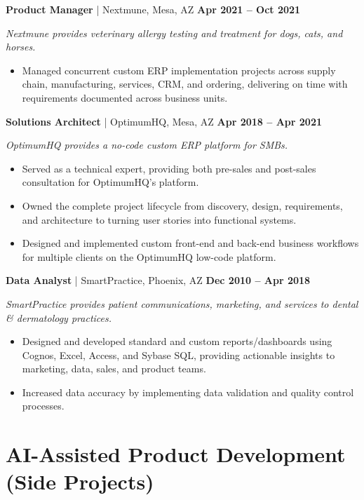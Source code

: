 \documentclass[10pt,letterpaper]{article}
\newcommand{\role}[4]{%
  \vspace{4pt}%
  {\textbf{#2} \textcolor{rulegray}{|} #1 \hfill \textbf{#3}}\par
  {\small\itshape #4\par}}
\newenvironment{roleblock}{\par\begin{minipage}{\textwidth}}{\end{minipage}\par\vspace{7pt}}
\begin{document}
\begin{roleblock}
\role{Nextmune, Mesa, AZ}{Product Manager}{Apr 2021 -- Oct 2021}
{Nextmune provides veterinary allergy testing and treatment for dogs, cats, and horses.}
\begin{itemize}
  \item Managed concurrent custom ERP implementation projects across supply chain, manufacturing, services, CRM, and ordering, delivering on time with requirements documented across business units.
\end{itemize}
\end{roleblock}

\begin{roleblock}
\role{OptimumHQ, Mesa, AZ}{Solutions Architect}{Apr 2018 -- Apr 2021}
{OptimumHQ provides a no-code custom ERP platform for SMBs.}
\begin{itemize}
  \item Served as a technical expert, providing both pre-sales and post-sales consultation for OptimumHQ's platform.
  \item Owned the complete project lifecycle from discovery, design, requirements, and architecture to turning user stories into functional systems.
  \item Designed and implemented custom front-end and back-end business workflows for multiple clients on the OptimumHQ low-code platform.
\end{itemize}
\end{roleblock}

\begin{roleblock}
\role{SmartPractice, Phoenix, AZ}{Data Analyst}{Dec 2010 -- Apr 2018}
{SmartPractice provides patient communications, marketing, and services to dental \& dermatology practices.}
\begin{itemize}
  \item Designed and developed standard and custom reports/dashboards using Cognos, Excel, Access, and Sybase SQL, providing actionable insights to marketing, data, sales, and product teams.
  \item Increased data accuracy by implementing data validation and quality control processes.
\end{itemize}
\end{roleblock}

\section{AI-Assisted Product Development (Side Projects)}
\end{document}
